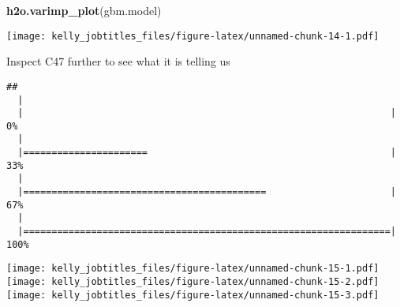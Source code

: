 \documentclass[]{article}
\newenvironment{Shaded}{\begin{snugshade}}{\end{snugshade}}
\newcommand{\KeywordTok}[1]{\textcolor[rgb]{0.13,0.29,0.53}{\textbf{{#1}}}}
\newcommand{\DataTypeTok}[1]{\textcolor[rgb]{0.13,0.29,0.53}{{#1}}}
\newcommand{\DecValTok}[1]{\textcolor[rgb]{0.00,0.00,0.81}{{#1}}}
\newcommand{\StringTok}[1]{\textcolor[rgb]{0.31,0.60,0.02}{{#1}}}
\newcommand{\NormalTok}[1]{{#1}}
\begin{document}
\begin{Shaded}
\begin{Highlighting}[]
\KeywordTok{h2o.varimp_plot}\NormalTok{(gbm.model)}
\end{Highlighting}
\end{Shaded}

\texttt{[image: kelly\_jobtitles\_files/figure-latex/unnamed-chunk-14-1.pdf]}

Inspect C47 further to see what it is telling us

\begin{Shaded}
\end{Shaded}

\begin{verbatim}
## 
  |                                                                       
  |                                                                 |   0%
  |                                                                       
  |======================                                           |  33%
  |                                                                       
  |===========================================                      |  67%
  |                                                                       
  |=================================================================| 100%
\end{verbatim}

\texttt{[image: kelly\_jobtitles\_files/figure-latex/unnamed-chunk-15-1.pdf]}
\texttt{[image: kelly\_jobtitles\_files/figure-latex/unnamed-chunk-15-2.pdf]}
\texttt{[image: kelly\_jobtitles\_files/figure-latex/unnamed-chunk-15-3.pdf]}
\end{document}

